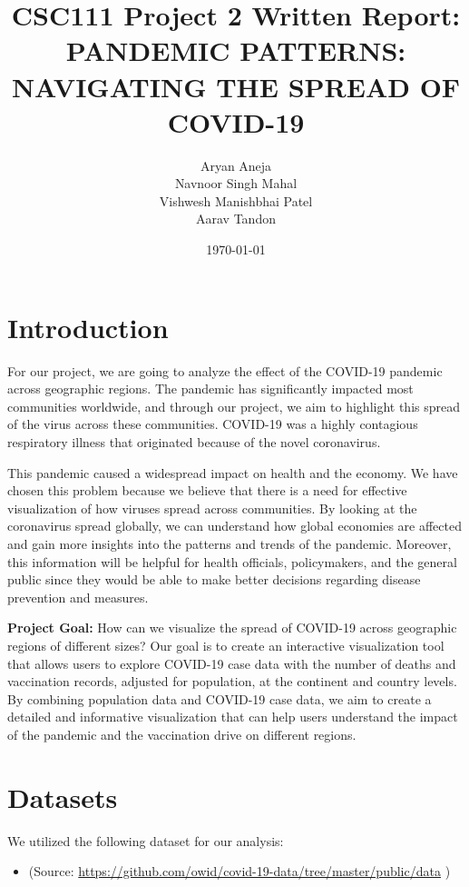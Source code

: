 \documentclass[fontsize=11pt]{article}
\title{CSC111 Project 2 Written Report: \\ PANDEMIC PATTERNS: NAVIGATING THE SPREAD OF COVID-19}
\author{Aryan Aneja \\
  Navnoor Singh Mahal \\
  Vishwesh Manishbhai Patel \\
  Aarav Tandon}
\date{\today}
\begin{document}
\maketitle

\section{Introduction}
For our project, we are going to analyze the effect of the COVID-19 pandemic across geographic regions. The pandemic has significantly impacted most communities worldwide, and through our project, we aim to highlight this spread of the virus across these communities. COVID-19 was a highly contagious respiratory illness that originated because of the novel coronavirus.

This pandemic caused a widespread impact on health and the economy. We have chosen this problem because we believe that there is a need for effective visualization of how viruses spread across communities. By looking at the coronavirus spread globally, we can understand how global economies are affected and gain more insights into the patterns and trends of the pandemic. Moreover, this information will be helpful for health officials, policymakers, and the general public since they would be able to make better decisions regarding disease prevention and measures.

\textbf{Project Goal:} How can we visualize the spread of COVID-19 across geographic regions of different sizes? Our goal is to create an interactive visualization tool that allows users to explore COVID-19 case data with the number of deaths and vaccination records, adjusted for population, at the continent and country levels. By combining population data and COVID-19 case data, we aim to create a detailed and informative visualization that can help users understand the impact of the pandemic and the vaccination drive on different regions.

\section{Datasets}
We utilized the following dataset for our analysis:

\begin{itemize}
  \item (Source: \href{https://github.com/owid/covid-19-data/tree/master/public/data}{https://github.com/owid/covid-19-data/tree/master/public/data} \cite{COVID-19 Data})
\end{itemize}
\end{document}
